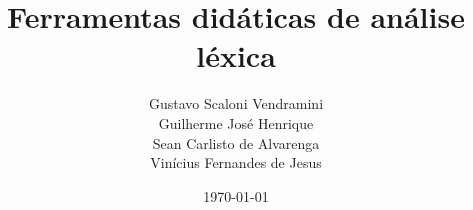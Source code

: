 \documentclass[a4paper]{article}
\title{Ferramentas didáticas de análise léxica}
\author{Gustavo Scaloni Vendramini    \\ 
        Guilherme José Henrique       \\
        Sean Carlisto de Alvarenga    \\
        Vinícius Fernandes de Jesus}
\date{\today}
\begin{document}
\maketitle
\pagebreak
\maketitle
\tableofcontents





\end{document}
